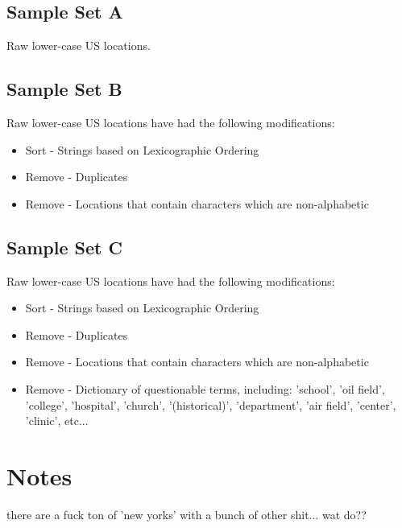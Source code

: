 \documentclass[11pt,a4paper]{article}
\begin{document}
\subsection{Sample Set A}
Raw lower-case US locations.

\subsection{Sample Set B}
Raw lower-case US locations have had the following modifications:
\begin{itemize}
	\item Sort - Strings based on Lexicographic Ordering
	\item Remove - Duplicates
	\item Remove - Locations that contain characters which are non-alphabetic
\end{itemize}

\subsection{Sample Set C}
Raw lower-case US locations have had the following modifications:
\begin{itemize}
	\item Sort - Strings based on Lexicographic Ordering	
	\item Remove - Duplicates
	\item Remove - Locations that contain characters which are non-alphabetic
	\item Remove - Dictionary of questionable terms, including: 'school', 'oil field', 'college', 'hospital', 'church', '(historical)', 'department', 'air field', 'center',
	'clinic', etc... 
\end{itemize}

\section{Notes}
there are a fuck ton of 'new yorks' with a bunch of other shit... wat do??
\end{document}
